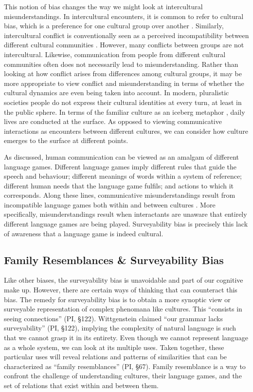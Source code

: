 This notion of bias changes the way we might look at intercultural misunderstandings. In intercultural encounters, it is common to refer to cultural bias, which is a preference for one cultural group over another \citep{Yingst2011a}. Similarly, intercultural conflict is conventionally seen as a perceived incompatibility between different cultural communities \citep{TingToomeyS}. However, many conflicts between groups are not intercultural. Likewise, communication from people from different cultural communities often does not necessarily lead to misunderstanding. Rather than looking at how conflict arises from differences among cultural groups, it may be more appropriate to view conflict and misunderstanding in terms of whether the cultural dynamics are even being taken into account. In modern, pluralistic societies people do not express their cultural identities at every turn, at least in the public sphere. In terms of the familiar culture as an iceberg metaphor \citep{Hall1973a,Hall1976a}, daily lives are conducted at the surface. As opposed to viewing communicative interactions as encounters between different cultures, we can consider how culture emerges to the surface at different points.	 

As discussed, human communication can be viewed as an amalgam of different language games. Different language games imply different rules that guide the speech and behaviour; different meanings of words within a system of reference; different human needs that the language game fulfils; and actions to which it corresponds. Along these lines, communicative misunderstandings result from incompatible language games both within and between cultures \citep[10]{Frayne2017a}. More specifically, misunderstandings result when interactants are unaware that entirely different language games are being played. Surveyability bias is precisely this lack of awareness that a language game is indeed cultural.

\subsection{Family Resemblances \& Surveyability Bias}

Like other biases, the surveyability bias is unavoidable and part of our cognitive make up. However, there are certain ways of thinking that can counteract this bias. The remedy for surveyability bias is to obtain a more synoptic view or surveyable representation of complex phenomana like cultures. This ``consists in seeing connections'' (PI, \S 122). Wittgenstein claimed ``our grammar lacks surveyability'' (PI, \S 122), implying the complexity of natural language is such that we cannot grasp it in its entirety. Even though we cannot represent language as a whole system, we can look at its multiple uses. Taken together, these particular uses will reveal relations and patterns of similarities that can be characterized as ``family resemblances'' (PI, \S 67). Family resemblance is a way to confront the challenge of understanding cultures, their language games, and the set of relations that exist within and between them.

